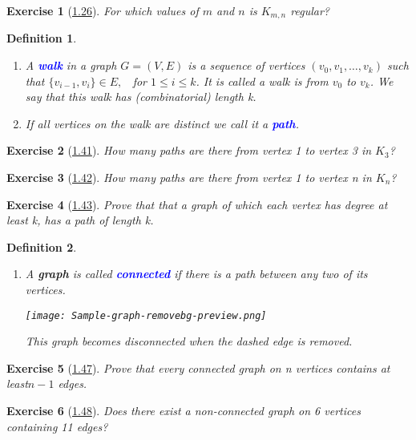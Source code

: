 \documentclass[10pt]{report}
\numberwithin{dummy}{section}
\theoremstyle{ocrenumbox}
\newtheorem{definitionT}{Exercise}[]
\theoremstyle{grayman}
\newtheorem{definitionTTTT}{Definition}[]
\newenvironment{exo}{\begin{dBox}\begin{definitionT}}{\end{definitionT}\end{dBox}}
\newenvironment{voc}{\begin{vBox}\begin{definitionTTTT}}{\end{definitionTTTT}\end{vBox}}
\begin{document}
\begin{exo}[\hypertarget{exo126}{\hyperlink{so126}{1.26}}] For which values of $m$ and $n$ is $K_{m,n}$ regular?
\end{exo}
\begin{voc}{}{}\leavevmode
\begin{enumerate}
    \item A  \textbf{\textcolor{blue}{walk}} in a graph $G = (V, E)$ is a sequence of vertices $(v_0, v_1, \dots , v_k)$ such
that  $\{v_{i-1}, v_i\} \in E,\phantom{a}$ for  $1 \leq i \leq  k $. It is called a walk is from $v_0$ to $v_k$.
We say that this walk has (combinatorial) length k. 
\item If all vertices on the walk are distinct we call it a \textbf{\textcolor{blue}{path}}.
\end{enumerate}
\end{voc}
\begin{exo}[\hypertarget{exo141}{\hyperlink{so141}{1.41}}] How many paths are there from vertex 1 to vertex 3 in $K_3$?
\end{exo}
\begin{exo}[\hypertarget{exo142}{\hyperlink{so142}{1.42}}] How many paths are there from vertex 1 to vertex n in $K_n$?
\end{exo}
\begin{exo}[\hypertarget{exo143}{\hyperlink{so143}{1.43}}]  Prove that that a graph of which each vertex has degree at least k, has a path of length k.
\end{exo}
\begin{voc}{}{}\leavevmode
\begin{enumerate}
    \item A \textbf{graph} is called \textbf{\textcolor{blue}{connected}} if there is a path between any two of its vertices.\\
    \begin{center}
        \texttt{[image: Sample-graph-removebg-preview.png]}
    \end{center}
    This graph becomes disconnected when the dashed edge is removed.
    \end{enumerate}
\end{voc}
\begin{exo}[\hypertarget{exo147}{\hyperlink{so147}{1.47}}]  Prove that every connected graph on n vertices contains at least$ n - 1$ edges.

\end{exo}
\begin{exo}[\hypertarget{exo148}{\hyperlink{so148}{1.48}}]  Does there exist a non-connected graph on 6 vertices containing 11 edges?
\end{exo}
\end{document}
